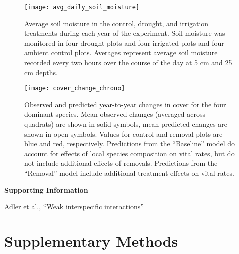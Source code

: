 \documentclass[11pt]{article}
\begin{document}
\begin{figure}[tbp]
	\centering
	\texttt{[image: avg\_daily\_soil\_moisture]}
	\caption{Average soil moisture in the control, drought, and irrigation treatments during each year of the experiment.  Soil moisture was monitored in four drought plots and four irrigated plots and four ambient control plots.  Averages represent average soil moisture recorded every two hours over the course of the day at 5 cm and 25 cm depths.}
	\label{fig:CoverTrends}
\end{figure}


\begin{figure}[tbp]
	\centering
	\texttt{[image: cover\_change\_chrono]}
	\caption{Observed and predicted year-to-year changes in cover for the four dominant species. Mean observed changes (averaged across quadrats) are shown in solid symbols, mean predicted changes are shown in open symbols. Values for control and removal plots are blue and red, respectively. Predictions from the ``Baseline'' model do account for effects of local species composition on vital rates, but do not include additional effects of removals. Predictions from the ``Removal'' model include additional treatment effects on vital rates. }
	\label{fig:CoverChange}
\end{figure}



\clearpage 
\newpage 

\setcounter{page}{1}
\setcounter{equation}{0}
\setcounter{figure}{0}
\setcounter{section}{0}
\setcounter{table}{0}
\renewcommand{\theequation}{SI.\arabic{equation}}
\renewcommand{\thetable}{SI-\arabic{table}}
\renewcommand{\thefigure}{SI-\arabic{figure}}
\renewcommand{\thesection}{Section SI.\arabic{section}}

\centerline{\Large \textbf{Supporting Information }}
\centerline{Adler et al., ``Weak interspecific interactions''} 

\vspace{0.4in} 

\section{Supplementary Methods} \label{suppMethods}
\end{document}
